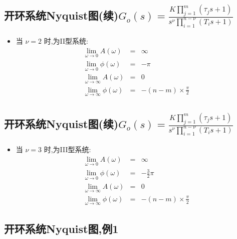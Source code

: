 \documentclass[table]{beamer}
\begin{document}
\subsection{开环系统Nyquist图(续)\(G_o(s) =\frac{K\prod_{j=1}^m(\tau_j s+1)}{s^{\nu}\prod_{i=1}^{n-\nu}(T_i s+1)}\)}
\label{sec:org63bfa07}
\begin{itemize}
\item 当  \(\nu=2\)  时,为II型系统:
\begin{eqnarray*}
\lim_{\omega\rightarrow 0} A(\omega) & = & \infty\\
\lim_{\omega\rightarrow 0} \phi(\omega)&=&-\pi \\
\lim_{\omega\rightarrow\infty} A(\omega)&=&0 \\
\lim_{\omega\rightarrow\infty} \phi(\omega)&=& -(n-m)\times\frac{\pi}{2} 
\end{eqnarray*}
\end{itemize}
\subsection{开环系统Nyquist图(续)\(G_o(s) =\frac{K\prod_{j=1}^m(\tau_j s+1)}{s^{\nu}\prod_{i=1}^{n-\nu}(T_i s+1)}\)}
\label{sec:org2d81142}
\begin{itemize}
\item 当  \(\nu=3\)  时,为III型系统:
\begin{eqnarray*}
\lim_{\omega\rightarrow 0} A(\omega) & = & \infty\\
\lim_{\omega\rightarrow 0} \phi(\omega)&=&-\frac{3}{2}\pi \\
\lim_{\omega\rightarrow\infty} A(\omega)&=&0 \\
\lim_{\omega\rightarrow\infty} \phi(\omega)&=& -(n-m)\times\frac{\pi}{2} 
\end{eqnarray*}
\end{itemize}

\subsection{开环系统Nyquist图,例1}
\label{sec:org34018b4}
\end{document}

